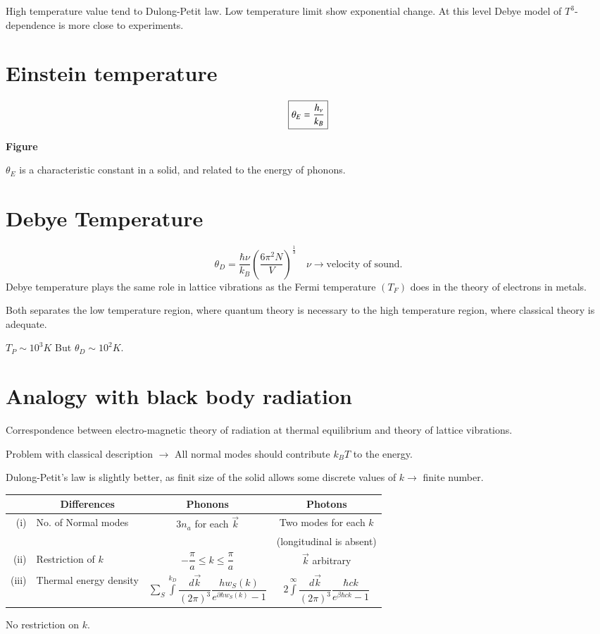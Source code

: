 High temperature value tend to Dulong-Petit law. Low temperature limit show exponential change. At this level Debye model of $T^{3}$-dependence is more close to experiments.

\section*{Einstein temperature}
$$
\fbox{$\theta_{E}=\dfrac{h_{\nu}}{k_{B}}$}
$$
\begin{center}
{\bf Figure}
\end{center}
$\theta_{E}$ is a characteristic constant in a solid, and related to the energy of phonons.

\section*{Debye Temperature}
$$
\theta_{D}=\dfrac{\hbar \nu}{k_{B}}\left(\dfrac{6\pi^{2}N}{V}\right)^{\frac{1}{3}}\quad \nu\to \text{velocity of sound.}
$$
Debye temperature plays the same role in lattice vibrations as the Fermi temperature $(T_{F})$ does in the theory of electrons in metals.

Both separates the low temperature region, where quantum theory is necessary to the high temperature region, where classical theory is adequate.

$T_{P}\sim 10^{3}K$ But $\theta_{D}\sim 10^{2}K$.

\section*{Analogy with black body radiation}

Correspondence between electro-magnetic theory of radiation at thermal equilibrium and theory of lattice vibrations.

Problem with classical description $\to$ All normal modes should contribute $k_{B}T$ to the energy.

Dulong-Petit's law is slightly better, as finit size of the solid allows some discrete values of $k\to$ finite number.
\begin{center}
\begin{tabular}{rlcc}
\hline
 & \multicolumn{1}{c}{\bf Differences} & {\bf Phonons} & {\bf Photons}\\
\hline
(i) & No. of Normal modes & $3n_{a}$ for each $\overrightarrow{k}$ & Two modes for each $k$\\
    &                     &                                       & (longitudinal is absent)\\[5pt]
(ii) & Restriction of $k$ & $-\dfrac{\pi}{a}\leq k\leq \dfrac{\pi}{a}$ & $\overrightarrow{k}$ arbitrary\\[10pt]
(iii) & Thermal energy density & $\sum\limits_{S}\int\limits^{k_{D}}\dfrac{d\overrightarrow{k}}{(2\pi)^{3}}\dfrac{hw_{S}(k)}{e^{\partial \hbar w_{S}(k)}-1}$ & $2\int\limits^{\infty}\dfrac{d\overrightarrow{k}}{(2\pi)^{3}}\dfrac{\hbar ck}{e^{\beta \hbar ck}-1}$\\
\hline
\end{tabular}
\end{center}
No restriction on $k$.

